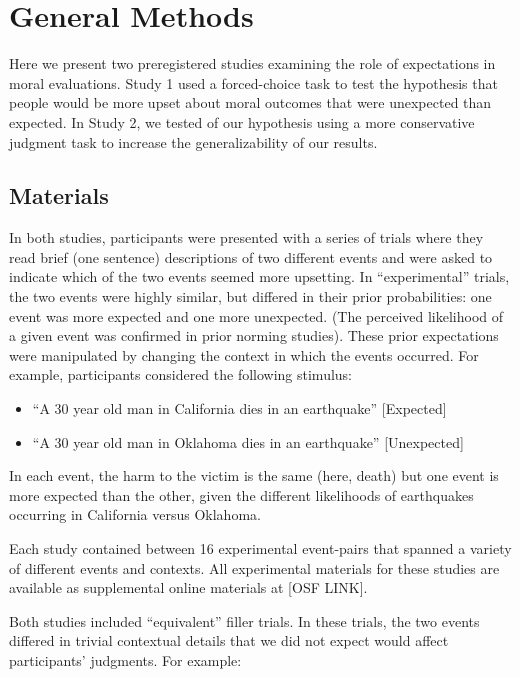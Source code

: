 \documentclass[12pt,]{article}
\begin{document}
\section{General Methods}\label{general-methods}

Here we present two preregistered studies examining the role of
expectations in moral evaluations. Study 1 used a forced-choice task to
test the hypothesis that people would be more upset about moral outcomes
that were unexpected than expected. In Study 2, we tested of our
hypothesis using a more conservative judgment task to increase the
generalizability of our results.

\subsection{Materials}\label{materials}

In both studies, participants were presented with a series of trials
where they read brief (one sentence) descriptions of two different
events and were asked to indicate which of the two events seemed more
upsetting. In ``experimental'' trials, the two events were highly
similar, but differed in their prior probabilities: one event was more
expected and one more unexpected. (The perceived likelihood of a given
event was confirmed in prior norming studies). These prior expectations
were manipulated by changing the context in which the events occurred.
For example, participants considered the following stimulus:

\begin{itemize}
\item
  ``A 30 year old man in California dies in an earthquake''
  {[}Expected{]}
\item
  ``A 30 year old man in Oklahoma dies in an earthquake''
  {[}Unexpected{]}
\end{itemize}

In each event, the harm to the victim is the same (here, death) but one
event is more expected than the other, given the different likelihoods
of earthquakes occurring in California versus Oklahoma.

Each study contained between 16 experimental event-pairs that spanned a
variety of different events and contexts. All experimental materials for
these studies are available as supplemental online materials at {[}OSF
LINK{]}.

Both studies included ``equivalent'' filler trials. In these trials, the
two events differed in trivial contextual details that we did not expect
would affect participants' judgments. For example:
\end{document}
